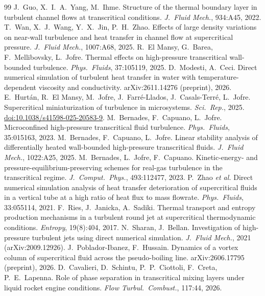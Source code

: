\documentclass[11pt]{article}
\begin{document}
\begin{thebibliography}{99}
 J.\ Guo, X.\ I.\ A.\ Yang, M.\ Ihme. Structure of the thermal boundary layer in turbulent channel flows at transcritical conditions. \emph{J.\ Fluid Mech.}, 934:A45, 2022.
 T.\ Wan, X.\ J.\ Wang, Y.\ X.\ Jin, P.\ H.\ Zhao. Effects of large density variations on near-wall turbulence and heat transfer in channel flow at supercritical pressure. \emph{J.\ Fluid Mech.}, 1007:A68, 2025.
 R.\ El Mansy, G.\ Barea, F.\ Mellibovsky, L.\ Jofre. Thermal effects on high-pressure transcritical wall-bounded turbulence. \emph{Phys.\ Fluids}, 37:105119, 2025.
 D.\ Modesti, A.\ Ceci. Direct numerical simulation of turbulent heat transfer in water with temperature-dependent viscosity and conductivity. arXiv:2611.14276 (preprint), 2026.
 E.\ Hurt\'an, R.\ El Mansy, M.\ Jofre, J.\ Farr\'e-Llados, J.\ Casals-Terr\'e, L.\ Jofre. Supercritical miniaturization of turbulence in microsystems. \emph{Sci.\ Rep.}, 2025. \href{https://doi.org/10.1038/s41598-025-20583-9}{doi:10.1038/s41598-025-20583-9}.
 M.\ Bernades, F.\ Capuano, L.\ Jofre. Microconfined high-pressure transcritical fluid turbulence. \emph{Phys.\ Fluids}, 35:015163, 2023.
 M.\ Bernades, F.\ Capuano, L.\ Jofre. Linear stability analysis of differentially heated wall-bounded high-pressure transcritical fluids. \emph{J.\ Fluid Mech.}, 1022:A25, 2025.
 M.\ Bernades, L.\ Jofre, F.\ Capuano. Kinetic-energy- and pressure-equilibrium-preserving schemes for real-gas turbulence in the transcritical regime. \emph{J.\ Comput.\ Phys.}, 493:112477, 2023.
 P.\ Zhao \emph{et al.} Direct numerical simulation analysis of heat transfer deterioration of supercritical fluids in a vertical tube at a high ratio of heat flux to mass flowrate. \emph{Phys.\ Fluids}, 33:055114, 2021.
 F.\ Ries, J.\ Janicka, A.\ Sadiki. Thermal transport and entropy production mechanisms in a turbulent round jet at supercritical thermodynamic conditions. \emph{Entropy}, 19(8):404, 2017.
 N.\ Sharan, J.\ Bellan. Investigation of high-pressure turbulent jets using direct numerical simulation. \emph{J.\ Fluid Mech.}, 2021 (arXiv:2009.12926).
 J.\ Poblador-Ibanez, F.\ Hussain. Dynamics of a vortex column of supercritical fluid across the pseudo-boiling line. arXiv:2606.17795 (preprint), 2026.
 D.\ Cavalieri, D.\ Schintu, P.\ P.\ Ciottoli, F.\ Creta, P.\ E.\ Lapenna. Role of phase separation in transcritical mixing layers under liquid rocket engine conditions. \emph{Flow Turbul.\ Combust.}, 117:44, 2026.

\end{thebibliography}
\end{document}
